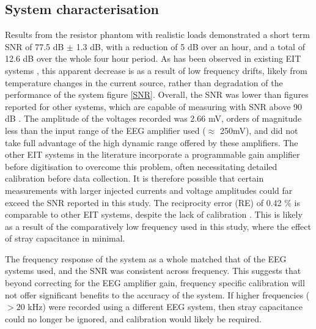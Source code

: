 \subsection{System characterisation}
Results from the resistor phantom with realistic loads demonstrated a short term SNR of 77.5 dB $\pm$ 1.3 dB, with a reduction of 5 dB over an hour, and a total of 12.6 dB over the whole four hour period. As has  been observed in existing EIT systems \cite{oh2007multi}, this apparent decrease is as a result of low frequency drifts, likely from temperature changes in the current source, rather than degradation of the performance of the system figure \ref{SNR}. Overall, the SNR was lower than figures reported for other systems, which are capable of measuring with SNR above 90 dB \cite{khan,Hun_Wi_2014}. The amplitude of the voltages recorded was 2.66 mV, orders of magnitude less than the input range of the EEG amplifier used ($\approx$ 250mV), and did not take full advantage of the high dynamic range offered by these amplifiers. The other EIT systems in the literature incorporate a programmable gain amplifier before digitisation to overcome this problem, often necessitating detailed calibration before data collection. It is therefore possible that certain measurements with larger injected currents and voltage amplitudes could far exceed the SNR reported in this study. The reciprocity error (RE) of 0.42 \% is comparable to other EIT systems, despite the lack of calibration \cite{oh2007multi,Hun_Wi_2014,khan}. This is likely as a result of the comparatively low frequency used in this study, where the effect of stray capacitance in minimal.  

The frequency response of the system as a whole matched that of the EEG systems used, and the SNR was consistent across frequency. This suggests that beyond correcting for the EEG amplifier gain, frequency specific calibration will not offer significant benefits to the accuracy of the system. If higher frequencies ($>20$ kHz) were recorded using a different EEG system, then stray capacitance could no longer be ignored, and calibration would likely be required. 
